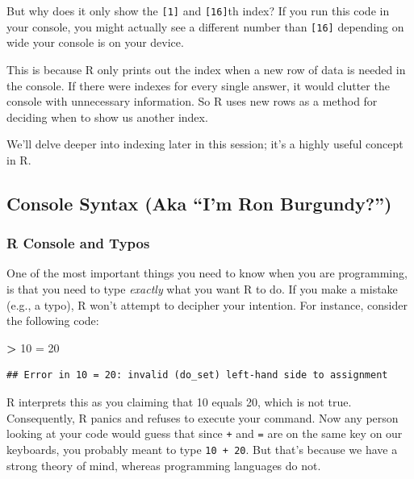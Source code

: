 \documentclass[
]{book}
\newenvironment{Shaded}{\begin{snugshade}}{\end{snugshade}}
\newcommand{\DecValTok}[1]{\textcolor[rgb]{0.00,0.00,0.81}{#1}}
\newcommand{\OtherTok}[1]{\textcolor[rgb]{0.56,0.35,0.01}{#1}}
\newcommand{\SpecialCharTok}[1]{\textcolor[rgb]{0.81,0.36,0.00}{\textbf{#1}}}
\begin{document}
But why does it only show the \texttt{{[}1{]}} and \texttt{{[}16{]}}th index? If you run this code in your console, you might actually see a different number than \texttt{{[}16{]}} depending on wide your console is on your device.

This is because R only prints out the index when a new row of data is needed in the console. If there were indexes for every single answer, it would clutter the console with unnecessary information. So R uses new rows as a method for deciding when to show us another index.

We'll delve deeper into indexing later in this session; it's a highly useful concept in R.

\hypertarget{console-syntax-aka-im-ron-burgundy}{%
\subsection{Console Syntax (Aka ``I'm Ron Burgundy?'')}\label{console-syntax-aka-im-ron-burgundy}}

\hypertarget{r-console-and-typos}{%
\subsubsection{R Console and Typos}\label{r-console-and-typos}}

One of the most important things you need to know when you are programming, is that you need to type \emph{exactly} what you want R to do. If you make a mistake (e.g., a typo), R won't attempt to decipher your intention. For instance, consider the following code:

\begin{Shaded}
\begin{Highlighting}[]
\SpecialCharTok{\textgreater{}} \DecValTok{10} \OtherTok{=} \DecValTok{20}
\end{Highlighting}
\end{Shaded}

\begin{verbatim}
## Error in 10 = 20: invalid (do_set) left-hand side to assignment
\end{verbatim}

R interprets this as you claiming that 10 equals 20, which is not true. Consequently, R panics and refuses to execute your command. Now any person looking at your code would guess that since \texttt{+} and \texttt{=} are on the same key on our keyboards, you probably meant to type \texttt{10\ +\ 20}. But that's because we have a strong theory of mind, whereas programming languages do not.
\end{document}
